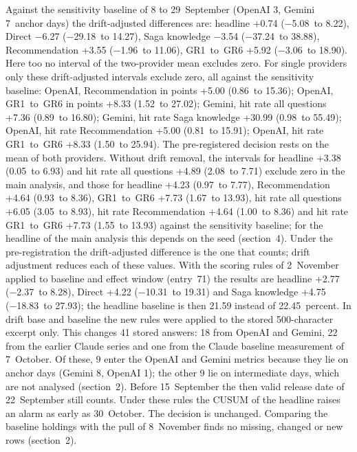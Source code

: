 \documentclass[11pt]{article}
\begin{document}
Against the sensitivity baseline of 8 to 29~September (OpenAI 3, Gemini 7~anchor days) the drift-adjusted differences are: headline +0.74 (−5.08~to 8.22), Direct −6.27 (−29.18~to 14.27), Saga knowledge −3.54 (−37.24~to 38.88), Recommendation +3.55 (−1.96~to 11.06), GR1~to~GR6 +5.92 (−3.06~to 18.90). Here too no interval of the two-provider mean excludes zero. For single providers only these drift-adjusted intervals exclude zero, all against the sensitivity baseline: OpenAI, Recommendation in points +5.00 (0.86~to 15.36); OpenAI, GR1~to~GR6 in points +8.33 (1.52~to 27.02); Gemini, hit rate all questions +7.36 (0.89~to 16.80); Gemini, hit rate Saga knowledge +30.99 (0.98~to 55.49); OpenAI, hit rate Recommendation +5.00 (0.81~to 15.91); OpenAI, hit rate GR1~to~GR6 +8.33 (1.50~to 25.94). The pre-registered decision rests on the mean of both providers. Without drift removal, the intervals for headline +3.38 (0.05~to 6.93) and hit rate all questions +4.89 (2.08~to 7.71) exclude zero in the main analysis, and those for headline +4.23 (0.97~to 7.77), Recommendation +4.64 (0.93~to 8.36), GR1~to~GR6 +7.73 (1.67~to 13.93), hit rate all questions +6.05 (3.05~to 8.93), hit rate Recommendation +4.64 (1.00~to 8.36) and hit rate GR1~to~GR6 +7.73 (1.55~to 13.93) against the sensitivity baseline; for the headline of the main analysis this depends on the seed (section~4). Under the pre-registration the drift-adjusted difference is the one that counts; drift adjustment reduces each of these values. With the scoring rules of 2~November applied to baseline and effect window (entry~71) the results are headline +2.77 (−2.37~to 8.28), Direct +4.22 (−10.31~to 19.31) and Saga knowledge +4.75 (−18.83~to 27.93); the headline baseline is then 21.59 instead of 22.45~percent. In drift base and baseline the new rules were applied to the stored 500-character excerpt only. This changes 41 stored answers: 18 from OpenAI and Gemini, 22 from the earlier Claude series and one from the Claude baseline measurement of 7~October. Of these, 9 enter the OpenAI and Gemini metrics because they lie on anchor days (Gemini 8, OpenAI 1); the other 9 lie on intermediate days, which are not analysed (section~2). Before 15~September the then valid release date of 22~September still counts. Under these rules the CUSUM of the headline raises an alarm as early as 30~October. The decision is unchanged. Comparing the baseline holdings with the pull of 8~November finds no missing, changed or new rows (section~2).
\end{document}
